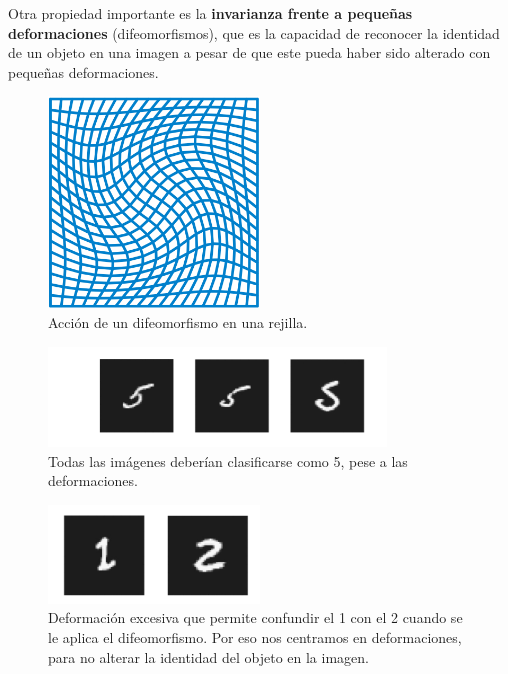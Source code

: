 \medskip

\noindent Otra propiedad importante es la \textbf{invarianza frente a pequeñas deformaciones} (difeomorfismos), que es la capacidad de reconocer la identidad de un objeto en una imagen a pesar de que este pueda haber sido alterado con pequeñas deformaciones.


\begin{figure}[!h]
  \centering
  \includegraphics[width=0.5\textwidth]{img/Diffeomorphism.png}
  \caption{Acción de un difeomorfismo en una rejilla.}
  \label{fig:difeomorfismo}
\end{figure}

\begin{figure}[!h]
  \centering
  \includegraphics[width=0.8\textwidth]{img/5_deformado.png}
  \caption{Todas las imágenes deberían clasificarse como 5, pese a las deformaciones.}
  \label{fig:deformaciones_5}
\end{figure}

\begin{figure}[!h]
  \centering
  \includegraphics[width=0.5\textwidth]{img/1_excesivamente_deformado.png}
  \caption{Deformación excesiva que permite confundir el 1 con el 2 cuando se le aplica el difeomorfismo. Por eso nos centramos en  deformaciones, para no alterar la identidad del objeto en la imagen.}
  \label{fig:deformaciones_1}
\end{figure}

